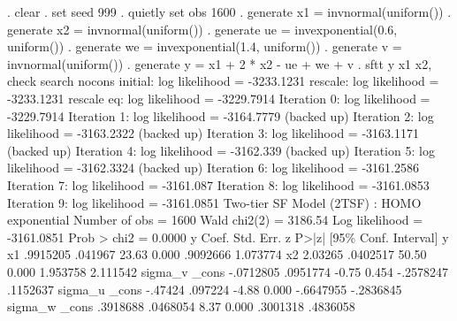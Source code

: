 . clear
{\smallskip}
. set seed 999
{\smallskip}
. quietly set obs 1600
{\smallskip}
. generate x1 = invnormal(uniform())
{\smallskip}
. generate x2 = invnormal(uniform())
{\smallskip}
. generate ue = invexponential(0.6, uniform())
{\smallskip}
. generate we = invexponential(1.4, uniform())
{\smallskip}
. generate v = invnormal(uniform())
{\smallskip}
. generate y = x1 + 2 * x2 - ue + we + v
{\smallskip}
. sftt y x1 x2, check search nocons
{\smallskip}
initial:       log likelihood = -3233.1231
rescale:       log likelihood = -3233.1231
rescale eq:    log likelihood = -3229.7914
Iteration 0:   log likelihood = -3229.7914  
Iteration 1:   log likelihood = -3164.7779  (backed up)
Iteration 2:   log likelihood = -3163.2322  (backed up)
Iteration 3:   log likelihood = -3163.1171  (backed up)
Iteration 4:   log likelihood =  -3162.339  (backed up)
Iteration 5:   log likelihood = -3162.3324  (backed up)
Iteration 6:   log likelihood = -3161.2586  
Iteration 7:   log likelihood =  -3161.087  
Iteration 8:   log likelihood = -3161.0853  
Iteration 9:   log likelihood = -3161.0851  
{\smallskip}
Two-tier SF Model (2TSF) : HOMO exponential       Number of obs   =       1600
                                                  Wald chi2(2)    =    3186.54
Log likelihood = -3161.0851                       Prob > chi2     =     0.0000
{\smallskip}
           y {\VBAR}      Coef.   Std. Err.      z    P>|z|     [95\% Conf. Interval]
y            {\VBAR}
          x1 {\VBAR}   .9915205    .041967    23.63   0.000     .9092666    1.073774
          x2 {\VBAR}    2.03265   .0402517    50.50   0.000     1.953758    2.111542
sigma_v      {\VBAR}
       _cons {\VBAR}  -.0712805   .0951774    -0.75   0.454    -.2578247    .1152637
sigma_u      {\VBAR}
       _cons {\VBAR}    -.47424    .097224    -4.88   0.000    -.6647955   -.2836845
sigma_w      {\VBAR}
       _cons {\VBAR}   .3918688   .0468054     8.37   0.000     .3001318    .4836058
